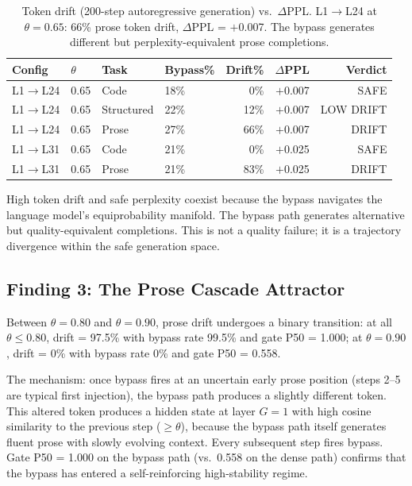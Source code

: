 \documentclass{article}
\begin{document}
\begin{table}[htbp]
\centering
\setlength{\tabcolsep}{4pt}
\renewcommand{\arraystretch}{1.10}
\begin{tabular}{llllrrr}
\toprule
\textbf{Config} & \textbf{$\theta$} & \textbf{Task}
  & \textbf{Bypass\%} & \textbf{Drift\%}
  & \textbf{$\Delta$PPL} & \textbf{Verdict} \\
\midrule
L1$\to$L24 & 0.65 & Code       & 18\% &  0\%  & $+$0.007 & SAFE \\
L1$\to$L24 & 0.65 & Structured & 22\% & 12\%  & $+$0.007 & LOW DRIFT \\
L1$\to$L24 & 0.65 & Prose      & 27\% & 66\%  & $+$0.007 & DRIFT \\
L1$\to$L31 & 0.65 & Code       & 21\% &  0\%  & $+$0.025 & SAFE \\
L1$\to$L31 & 0.65 & Prose      & 21\% & 83\%  & $+$0.025 & DRIFT \\
\bottomrule
\end{tabular}
\caption{Token drift (200-step autoregressive generation) vs.\
$\Delta$PPL. L1$\to$L24 at $\theta = 0.65$: 66\% prose token drift,
$\Delta$PPL = $+$0.007. The bypass generates different but
perplexity-equivalent prose completions.}
\label{tab:llm-drift}
\end{table}

High token drift and safe perplexity coexist because the bypass navigates
the language model's equiprobability manifold. The bypass path generates
alternative but quality-equivalent completions. This is not a quality
failure; it is a trajectory divergence within the safe generation space.

\subsection{Finding 3: The Prose Cascade Attractor}
\label{sec:prose-cascade}

Between $\theta = 0.80$ and $\theta = 0.90$, prose drift undergoes a
binary transition: at all $\theta \leq 0.80$, drift = 97.5\% with
bypass rate 99.5\% and gate P50 = 1.000; at $\theta = 0.90$, drift = 0\%
with bypass rate 0\% and gate P50 = 0.558.

The mechanism: once bypass fires at an uncertain early prose position
(steps 2--5 are typical first injection), the bypass path produces a
slightly different token. This altered token produces a hidden state at
layer $G=1$ with high cosine similarity to the previous step
($\geq \theta$), because the bypass path itself generates fluent prose
with slowly evolving context. Every subsequent step fires bypass. Gate
P50 = 1.000 on the bypass path (vs.\ 0.558 on the dense path) confirms
that the bypass has entered a self-reinforcing high-stability regime.
\end{document}
